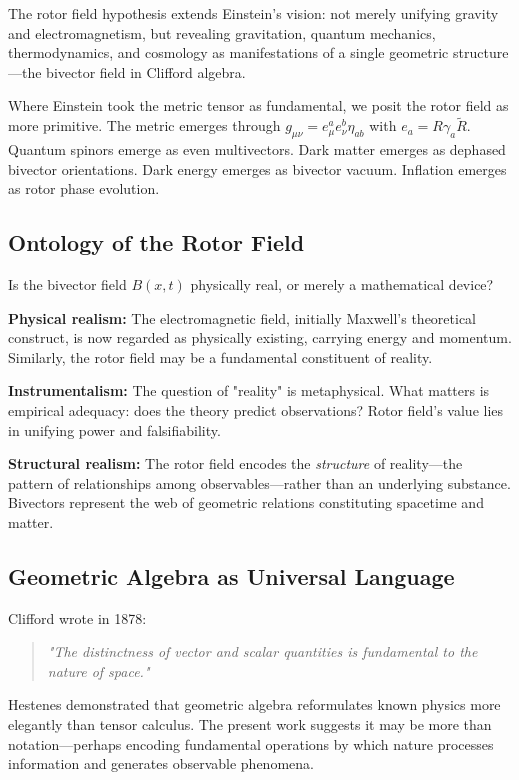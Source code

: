 \documentclass[11pt,a4paper]{article}
\numberwithin{equation}{section}
\theoremstyle{plain}
\theoremstyle{definition}
\theoremstyle{remark}
\newcommand{\rev}[1]{\widetilde{#1}}       %
\begin{document}
The rotor field hypothesis extends Einstein's vision: not merely unifying gravity and electromagnetism, but revealing gravitation, quantum mechanics, thermodynamics, and cosmology as manifestations of a single geometric structure—the bivector field in Clifford algebra.

Where Einstein took the metric tensor as fundamental, we posit the rotor field as more primitive. The metric emerges through $g_{\mu\nu} = e^a_\mu e^b_\nu \eta_{ab}$ with $e_a = R\gamma_a\rev{R}$. Quantum spinors emerge as even multivectors. Dark matter emerges as dephased bivector orientations. Dark energy emerges as bivector vacuum. Inflation emerges as rotor phase evolution.

\subsection{Ontology of the Rotor Field}

Is the bivector field $B(x,t)$ physically real, or merely a mathematical device?

\textbf{Physical realism:} The electromagnetic field, initially Maxwell's theoretical construct, is now regarded as physically existing, carrying energy and momentum. Similarly, the rotor field may be a fundamental constituent of reality.

\textbf{Instrumentalism:} The question of "reality" is metaphysical. What matters is empirical adequacy: does the theory predict observations? Rotor field's value lies in unifying power and falsifiability.

\textbf{Structural realism:} The rotor field encodes the \emph{structure} of reality—the pattern of relationships among observables—rather than an underlying substance. Bivectors represent the web of geometric relations constituting spacetime and matter.

\subsection{Geometric Algebra as Universal Language}

Clifford wrote in 1878:

\begin{quote}
\textit{"The distinctness of vector and scalar quantities is fundamental to the nature of space."}
\end{quote}

Hestenes demonstrated that geometric algebra reformulates known physics more elegantly than tensor calculus. The present work suggests it may be more than notation—perhaps encoding fundamental operations by which nature processes information and generates observable phenomena.
\end{document}
